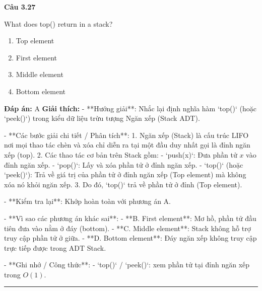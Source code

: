 \documentclass[11pt,a4paper]{article}
\newenvironment{question}[1]{%
  \par\vspace{1em}\noindent\textbf{\large Câu #1}\par\vspace{0.4em}
}{%
  \par\vspace{1em}\hrule\vspace{0.6em}
}
\newenvironment{choices}{%
  \begin{enumerate}[label=\textbf{\Alph*.},leftmargin=2.2em,itemsep=2pt,topsep=3pt]
}{%
  \end{enumerate}
}
\newcommand{\choice}{\item}
\begin{document}
\begin{question}{3.27}
What does top() return in a stack?
\begin{choices}
\choice Top element
\choice First element
\choice Middle element
\choice Bottom element
\end{choices}
\textbf{Đáp án:} A
\textbf{Giải thích:} - **Hướng giải**:
  Nhắc lại định nghĩa hàm `top()` (hoặc `peek()`) trong kiểu dữ liệu trừu tượng Ngăn xếp (Stack ADT).

- **Các bước giải chi tiết / Phân tích**:
  1. Ngăn xếp (Stack) là cấu trúc LIFO nơi mọi thao tác chèn và xóa chỉ diễn ra tại một đầu duy nhất gọi là đỉnh ngăn xếp (top).
  2. Các thao tác cơ bản trên Stack gồm:
     - `push(x)`: Đưa phần tử \(x\) vào đỉnh ngăn xếp.
     - `pop()`: Lấy và xóa phần tử ở đỉnh ngăn xếp.
     - `top()` (hoặc `peek()`): Trả về giá trị của phần tử ở đỉnh ngăn xếp (Top element) mà không xóa nó khỏi ngăn xếp.
  3. Do đó, `top()` trả về phần tử ở đỉnh (Top element).

- **Kiểm tra lại**:
  Khớp hoàn toàn với phương án A.

- **Vì sao các phương án khác sai**:
  - **B. First element**: Mơ hồ, phần tử đầu tiên đưa vào nằm ở đáy (bottom).
  - **C. Middle element**: Stack không hỗ trợ truy cập phần tử ở giữa.
  - **D. Bottom element**: Đáy ngăn xếp không truy cập trực tiếp được trong ADT Stack.

- **Ghi nhớ / Công thức**:
  - `top()` / `peek()`: xem phần tử tại đỉnh ngăn xếp trong \(O(1)\).
\end{question}
\end{document}
